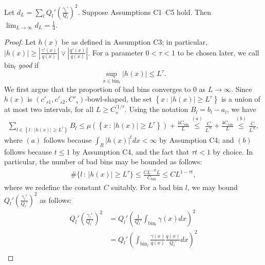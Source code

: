 \documentclass{article}
\newcommand{\bin}{\text{bin}}
\begin{document}

\begin{lemma}
\label{prop:d_dL_convergence}
Let $d_L = \sum_l Q_l' \left( \frac{\gamma_l'}{Q_l} \right)^2$. Suppose Assumptions C1--C5 hold. Then $\lim_{L \to \infty} d_L = \frac{1}{4}$.
\end{lemma}

\begin{proof}
Let $h(x)$ be as defined in Assumption C3; in particular, $|h(x)| \geq 
\left| \frac{\gamma'(x)}{q(x)} \right| \vee \left| \frac{q'(x)}{q(x)} \right|$.  For a parameter $0 < \tau < 1$ to be chosen later, we call $\bin_l$ \emph{good} if
$$
\sup_{x \in \bin_l} |h(x)| \leq L^\tau.
$$
We first argue that the proportion of bad bins converges to 0 as $L \rightarrow \infty$. Since $h(x)$ is $(c'_{s1}, c'_{s2}, C'_s)$-bowl-shaped, the set $\left \{x \,:\, |h(x)|  \geq L^\tau \right \}$ is a union of at most two intervals, for all $L \geq C_s^{\prime 1/\tau}$. Using the notation $B_l = b_l - a_l$, we have
\begin{align*}
\sum_{l \in \left \{ l \,:\, |h(x)| 
           \geq L^\tau \right \}}  B_l \leq 
   \mu \left( \left\{x \,:\, |h(x)|
         \geq L^\tau \right\} \right) + \frac{4 C_\bin}{L} \stackrel{(a)}\leq \frac{C}{L^{\tau t}}  + \frac{4 C_\bin}{L} \stackrel{(b)}\leq \frac{C}{L^{\tau t}},
\end{align*}
where $(a)$ follows because $\int_R |h(x)|^t dx < \infty$ by Assumption C4; and $(b)$ follows because $t \leq 1$ by Assumption C4, and the fact that $\tau t < 1$ by choice. In particular, the number of bad bins may be bounded as follows:
\begin{align*}
\# \{ l \,:\, |h(x)| \geq L^\tau \} \leq \frac{C L^{- \tau t} L}{C_\bin}  \leq C L^{1 - \tau t},
\end{align*}
where we redefine the constant $C$ suitably. For a bad bin $l$, we may bound $Q_l' \left( \frac{\gamma_l'}{Q_l'} \right)^2$ as follows:
\begin{align*}
Q_l' \left( \frac{\gamma_l'}{Q_l'} \right)^2 &= Q_l' \left( \frac{1}{Q_l'} \int_{\bin_l} \gamma(x) dx \right)^2 \\
   &= Q_l' \left(  \int_{\bin_l} \frac{\gamma(x)}{q(x)} \frac{q(x)}{Q_l'} dx \right)^2 \\

\end{align*}
\end{proof}
\end{document}
